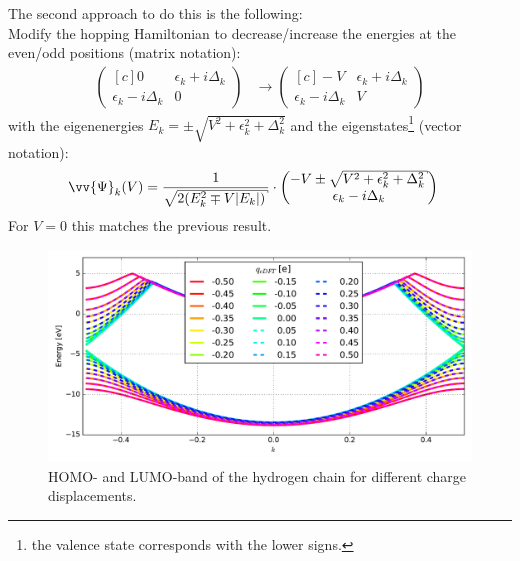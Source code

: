 The second approach to do this is the following:\\
Modify the hopping Hamiltonian to decrease/increase the energies at the even/odd positions (matrix notation):
\begin{align}
\begin{pmatrix*}[c]
0 & \epsilon_k + i \Delta_k \\
\epsilon_k - i \Delta_k & 0
\end{pmatrix*} 
&\to 
\begin{pmatrix*}[c]
-V & \epsilon_k + i \Delta_k \\
\epsilon_k - i \Delta_k & V
\end{pmatrix*}
\end{align}
with the eigenenergies $E_k = \pm \sqrt{V^2+\epsilon_k^2+\Delta_k^2}$ and the eigenstates\footnote{the valence state corresponds with the lower signs.} (vector notation):
\begin{align}
\vv{\Psi}_k(V) &= \frac{1}{\sqrt{2\left(E_k^2\mp V|E_k|\right)}}\cdot \begin{pmatrix*}[c]
-V\pm \sqrt{V^2+\epsilon_k^2+\Delta_k^2}\\
\epsilon_k - i \Delta_k
\end{pmatrix*}
\end{align}
For $V=0$ this matches the previous result.\\
\begin{figure}[!p]
	\centering
	\includegraphics[width = 12cm]{Images/Hydrogen/charging/band_structure_q_1}
	\caption{HOMO- and LUMO-band of the hydrogen chain for different charge displacements.}
	\label{image_hydrogen_charged_bands}
\end{figure}
